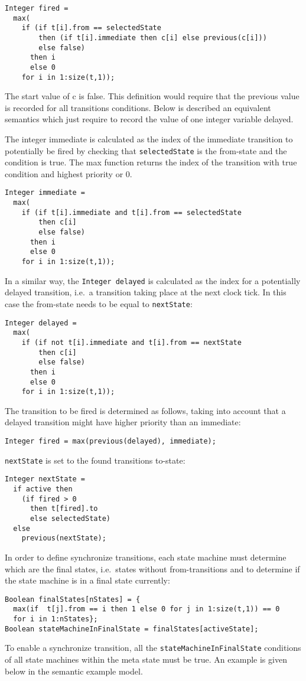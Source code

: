 \begin{lstlisting}[language=modelica]
Integer fired =
  max(
    if (if t[i].from == selectedState
        then (if t[i].immediate then c[i] else previous(c[i]))
        else false)
      then i
      else 0
    for i in 1:size(t,1));
\end{lstlisting}
The start value of c is false. This definition would require that the
previous value is recorded for all transitions conditions. Below is
described an equivalent semantics which just require to record the value
of one integer variable delayed.

The integer immediate is calculated as the index of the immediate
transition to potentially be fired by checking that \lstinline!selectedState! is the
from-state and the condition is true. The max function returns the index
of the transition with true condition and highest priority or 0.

\begin{lstlisting}[language=modelica]
Integer immediate =
  max(
    if (if t[i].immediate and t[i].from == selectedState
        then c[i]
        else false)
      then i
      else 0
    for i in 1:size(t,1));
\end{lstlisting}

In a similar way, the \lstinline!Integer delayed! is calculated as the index for a
potentially delayed transition, i.e.\ a transition taking place at the
next clock tick. In this case the from-state needs to be equal to
\lstinline!nextState!:
\begin{lstlisting}[language=modelica]
Integer delayed =
  max(
    if (if not t[i].immediate and t[i].from == nextState
        then c[i]
        else false)
      then i
      else 0
    for i in 1:size(t,1));
\end{lstlisting}

The transition to be fired is determined as follows, taking into account
that a delayed transition might have higher priority than an immediate:
\begin{lstlisting}[language=modelica]
Integer fired = max(previous(delayed), immediate);
\end{lstlisting}
\lstinline!nextState! is set to the found transitions to-state:
\begin{lstlisting}[language=modelica]
Integer nextState =
  if active then
    (if fired > 0
      then t[fired].to
      else selectedState)
  else
    previous(nextState);
\end{lstlisting}
In order to define synchronize transitions, each state machine must
determine which are the final states, i.e.\ states without
from-transitions and to determine if the state machine is in a final
state currently:
\begin{lstlisting}[language=modelica]
Boolean finalStates[nStates] = {
  max(if  t[j].from == i then 1 else 0 for j in 1:size(t,1)) == 0
  for i in 1:nStates};
Boolean stateMachineInFinalState = finalStates[activeState];
\end{lstlisting}
To enable a synchronize transition, all the \lstinline!stateMachineInFinalState! conditions of all state machines within the meta state must be true.  An example is given below in the semantic example model.

